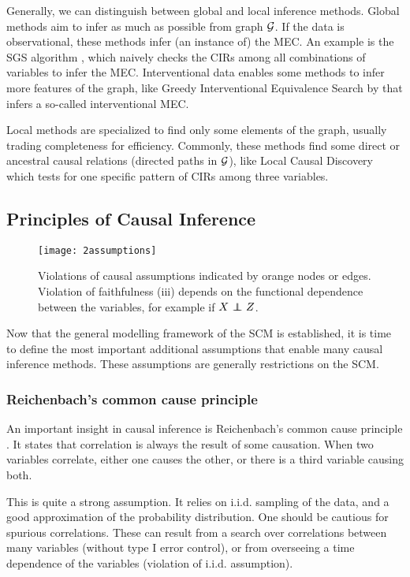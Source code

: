 Generally, we can distinguish between global and local inference methods. Global methods aim to infer as much as possible from graph $\mathcal{G}$. If the data is observational, these methods infer (an instance of) the MEC. An example is the SGS algorithm \citep{spirtes2000causation}, which naively checks the CIRs among all combinations of variables to infer the MEC. Interventional data enables some methods to infer more features of the graph, like Greedy Interventional Equivalence Search by \citet{hauser2012characterization} that infers a so-called interventional MEC. 

Local methods are specialized to find only some elements of the graph, usually trading completeness for efficiency. Commonly, these methods find some direct or ancestral causal relations (directed paths in $\mathcal{G}$), like Local Causal Discovery \citep{cooper1997simple} which tests for one specific pattern of CIRs among three variables.


\subsection{Principles of Causal Inference}
\label{sec:back:prin}

\begin{figure}[h]
    \centering
    \texttt{[image: 2assumptions]}
    \caption{Violations of causal assumptions indicated by orange nodes or edges. Violation of faithfulness (iii) depends on the functional dependence between the variables, for example if $X \operatorname*{{\,\perp\mkern-12mu\perp\,}} Z$.}
    \label{fig:2:ass}
\end{figure}

Now that the general modelling framework of the SCM is established, it is time to define the most important additional assumptions that enable many causal inference methods. These assumptions are generally restrictions on the SCM.

\subsubsection{Reichenbach's common cause principle}

An important insight in causal inference is Reichenbach's common cause principle \citep{reichenbach1956direction}. It states that correlation is always the result of some causation. When two variables correlate, either one causes the other, or there is a third variable causing both. 

This is quite a strong assumption. It relies on i.i.d. sampling of the data, and a good approximation of the probability distribution. One should be cautious for spurious correlations. These can result from a search over correlations between many variables (without type I error control), or from overseeing a time dependence of the variables (violation of i.i.d. assumption). 

